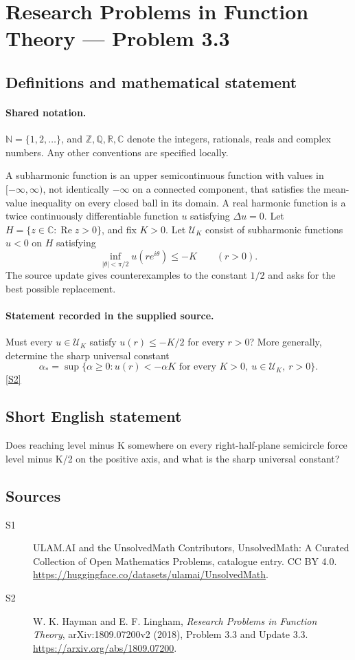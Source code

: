 \documentclass[11pt]{article}
\newcommand{\sref}[2]{\hyperlink{source:#1:#2}{[S#2]}}
\begin{document}
\section{Research Problems in Function Theory — Problem 3.3}\label{statement}

\subsection{Definitions and mathematical statement}

\paragraph{Shared notation.}$\mathbb N=\{1,2,\ldots\}$, and $\mathbb Z,\mathbb Q,\mathbb R,\mathbb C$ denote the integers, rationals, reals and complex numbers. Any other conventions are specified locally.


A subharmonic function is an upper semicontinuous function with values in $[-\infty,\infty)$, not identically $-\infty$ on a connected component, that satisfies the mean-value inequality on every closed ball in its domain. A real harmonic function is a twice continuously differentiable function $u$ satisfying $\Delta u=0$. Let $H=\{z\in\mathbb C:\operatorname{Re}z>0\}$, and fix $K>0$. Let $\mathcal U_K$ consist of subharmonic functions $u<0$ on $H$ satisfying
\[\inf_{|\theta|<\pi/2}u(re^{i\theta})\leq-K\qquad(r>0).\]
The source update gives counterexamples to the constant $1/2$ and asks for the best possible replacement.
\paragraph{Statement recorded in the supplied source.}
Must every $u\in\mathcal U_K$ satisfy $u(r)\leq-K/2$ for every $r>0$? More generally, determine the sharp universal constant
\[\alpha_* =\sup\{\alpha\geq0: u(r)<-\alpha K\text{ for every }K>0,\ u\in\mathcal U_K,\ r>0\}.\] \sref{statement}{2}
\subsection{Short English statement}
Does reaching level minus K somewhere on every right-half-plane semicircle force level minus K/2 on the positive axis, and what is the sharp universal constant?
\subsection{Sources}
\begin{description}
\item[\hypertarget{source:statement:1}{S1}] ULAM.AI and the UnsolvedMath Contributors, UnsolvedMath: A Curated Collection of Open Mathematics Problems, catalogue entry. CC BY 4.0. \url{https://huggingface.co/datasets/ulamai/UnsolvedMath}.
\item[\hypertarget{source:statement:2}{S2}] W. K. Hayman and E. F. Lingham, \emph{Research Problems in Function Theory}, arXiv:1809.07200v2 (2018), Problem 3.3 and Update 3.3. \url{https://arxiv.org/abs/1809.07200}.
\end{description}
\label{end:statement}
\end{document}
